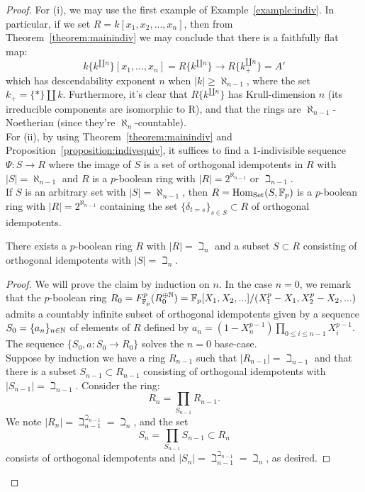 \begin{proof}
For (i), we may use the first example of Example~\ref{example:indiv}. In particular, if we set $R = k[x_1,x_2,...,x_n]$, 
then from Theorem~\ref{theorem:mainindiv} we may conclude that there is a faithfully flat map:
\[k\{k^{\amalg n}\}[x_1,...,x_n] = R\{k^{\amalg n}\} \to R\{k_{+}^{\amalg n}\}= A'\]
which has descendability exponent $n$ when $|k| \ge \aleph_{n-1}$, where the set $k_+ = \{*\}\amalg k$. 
Furthermore, it's clear that $R\{k^{\amalg n}\}$ has Krull-dimension $n$ (its irreducible components are isomorphic to R), 
and that the rings are $\aleph_{n-1}$-Noetherian (since they're $\aleph_n$-countable).\\
\indent For (ii), by using Theorem~\ref{theorem:mainindiv} and Proposition~\ref{proposition:indivequiv}, 
it suffices to find a $1$-indivisible sequence $\Psi: S \to R$ where the image of $S$ is a set of orthogonal idempotents in $R$ 
with $|S|=\aleph_{n-1}$ and $R$ is a $p$-boolean ring with $|R|=2^{\aleph_{n-1}}$ or $\beth_{n-1}$.\\
\indent If $S$ is an arbitrary set with $|S|=\aleph_{n-1}$, then $R= \text{Hom}_{\mathrm{Set}}(S, \mathbb{F}_p)$ is a $p$-boolean ring with $|R|=2^{\aleph_{n-1}}$ containing the set $\{\delta_{t=s}\}_{s \in S}\subset R$ of orthogonal idempotents.
\begin{claim}
There exists a $p$-boolean ring $R$ with $|R| = \beth_n$ and a subset $S \subset R$ consisting of orthogonal idempotents with $|S|=\beth_n$.
\end{claim}
\begin{proof}
We will prove the claim by induction on $n$. In the case $n=0$, we remark that the $p$-boolean ring $R_0=F_{\mathbb{F}_p}^p(R_0^{\oplus \mathbb{N}})=\mathbb{F}_p[X_1,X_2,...]/(X_1^p-X_1,X_2^p-X_2,...)$ admits a countably infinite subset of orthogonal idempotents given by a sequence $S_0=\{a_n\}_{n \in \mathbb{N}}$ of elements of $R$ defined by $a_n = (1-X^{p-1}_n) \prod_{0 \le i \le n-1} X^{p-1}_{i}$. The sequence $\{S_0, a: S_0 \to R_0\}$ solves the $n=0$ base-case.\\
\indent Suppose by induction we have a ring $R_{n-1}$ such that $|R_{n-1}| = \beth_{n-1}$ and that there is a subset $S_{n-1} \subset R_{n-1}$ consisting of orthogonal idempotents with $|S_{n-1}| = \beth_{n-1}$. Consider the ring:
\[R_n=\prod_{S_{n-1}}R_{n-1}.\]
We note $|R_n| = \beth_{n-1}^{\beth_{n-1}} = \beth_n$, and the set
\[S_n = \prod_{S_{n-1}} S_{n-1} \subset R_n\]
consists of orthogonal idempotents and $|S_n|=\beth_{n-1}^{\beth_{n-1}}=\beth_n$, as desired.
\end{proof}
\end{proof}
